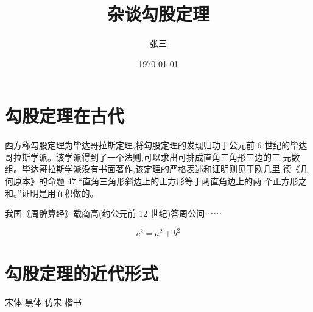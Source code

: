 \documentclass[UTF8]{ctexart}
\title{\heiti 杂谈勾股定理}
\author{\kaishu 张三}
\date{\today}
\begin{document}
\maketitle 

\tableofcontents 

\newpage
\section{勾股定理在古代}

西方称勾股定理为毕达哥拉斯定理,将勾股定理的发现归功于公元前 6 世纪的毕达哥拉斯学派。该学派得到了一个法则,可以求出可排成直角三角形三边的三 元数组。毕达哥拉斯学派没有书面著作,该定理的严格表述和证明则见于欧几里 德《几何原本》的命题 47:“直角三角形斜边上的正方形等于两直角边上的两
个正方形之和。”证明是用面积做的。 

我国《周髀算经》载商高(约公元前 12 世纪)答周公问⋯⋯

$$c^2 = a^2 + b^2$$
\newpage
\section{勾股定理的近代形式} 
{\songti 宋体} {\heiti 黑体} {\fangsong 仿宋} {\kaishu 楷书} 

\newpage


\newpage
{}
\end{document}
